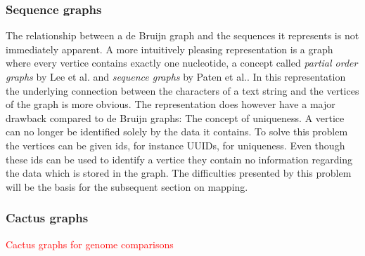 \documentclass[thesis.tex]{subfiles}
\begin{document}
\subsubsection{Sequence graphs}
The relationship between a de Bruijn graph and the sequences it represents is not immediately apparent. A more intuitively pleasing representation is a graph where every vertice contains exactly one nucleotide, a concept called \textit{partial order graphs} by Lee et al.\cite{improved_genome_inference_in_the_mhc_using_a_population_reference_graph} and \textit{sequence graphs} by Paten et al.\cite{mapping_to_a_reference_genome_structure}. In this representation the underlying connection between the characters of a text string and the vertices of the graph is more obvious. The representation does however have a major drawback compared to de Bruijn graphs: The concept of uniqueness. A vertice can no longer be identified solely by the data it contains. To solve this problem the vertices can be given ids, for instance UUIDs\cite{mapping_to_a_reference_genome_structure}, for uniqueness. Even though these ids can be used to identify a vertice they contain no information regarding the data which is stored in the graph. The difficulties presented by this problem will be the basis for the subsequent section on mapping.
\subsubsection{Cactus graphs}
\textcolor{red}{Cactus graphs for genome comparisons}
\end{document}
